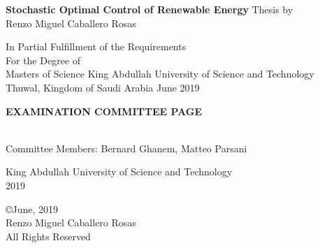 \documentclass[onecolumn, 12 pt, doublespace, fullpage, letterpaper]{report}
\theoremstyle{definition}
\begin{document}

\vspace{2pt}
\thispagestyle{empty}
\addvspace{10mm}

\begin{center}

{\textbf{{\large Stochastic Optimal Control of Renewable Energy}}}\vfill 
{Thesis by}\\
{Renzo Miguel Caballero Rosas}\vfill

{ In Partial Fulfillment of the Requirements}\\[12pt]
{ For the Degree of}\\[12pt]
{Masters of Science} \vfill
{King Abdullah University of Science and Technology }\\
{Thuwal, Kingdom of Saudi Arabia}
\vfill
{June 2019}

\end{center}

\newpage

\begin{center}

\end{center}

\begin{center}

{ \textbf{{\large EXAMINATION COMMITTEE PAGE}}}\\\vspace{1cm}

\end{center}

\vspace{4\baselineskip}

\begin{onehalfspacing}
\\
Committee Members: Bernard Ghanem, Matteo Parsani\vfill
\end{onehalfspacing}

\begin{center}
{King Abdullah University of Science and Technology}\\
{2019}
\end{center}

\newpage
{}
\vspace*{\fill}
\begin{center}
{ \copyright June, 2019}\\
{Renzo Miguel Caballero Rosas}\\
{All Rights Reserved}
\end{center}
\end{document}
